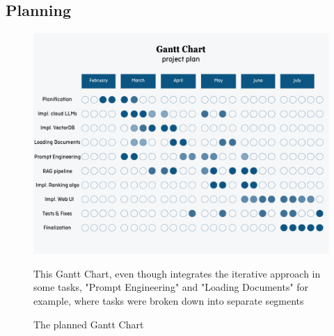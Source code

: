 \subsection{Planning}
\begin{figure}[htbp]
    \centering
    \includegraphics[width=\linewidth]{./figures/gantt-chart-1.png}
    \caption{The planned Gantt Chart}
    \begin{flushleft}
        \small This Gantt Chart, even though integrates the iterative approach in some tasks, "Prompt Engineering" and "Loading Documents" for example, where tasks were broken down into separate segments
    \end{flushleft}
\end{figure}